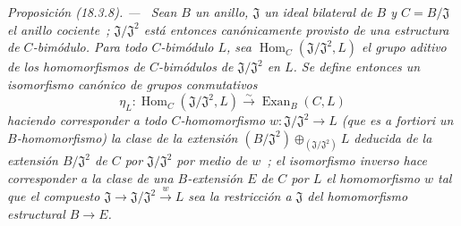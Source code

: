 \documentclass[10pt,oneside]{book}
\makeatletter
\newcommand{\setmanualcurrentlabel}[1]{\def\@currentlabel{#1}}
\newenvironment{proposition}[1][]{%
  \setmanualcurrentlabel{#1}\par\medskip\noindent\itshape Proposición (#1). ---\ }{\par}
\makeatother
\begin{document}
\begin{proposition}[18.3.8]
\label{0.18.3.8-es}
Sean $B$ un anillo, $\mathfrak J$ un ideal bilateral de $B$ y
$C=B/\mathfrak J$ el anillo cociente~; $\mathfrak J/\mathfrak J^2$ está entonces
canónicamente provisto de una estructura de $C$-bimódulo. Para todo $C$-bimódulo
$L$, sea $\operatorname{Hom}_C(\mathfrak J/\mathfrak J^2,L)$ el grupo
aditivo de los homomorfismos de $C$-bimódulos de $\mathfrak J/\mathfrak J^2$
en $L$. Se define entonces un \textup{isomorfismo} canónico de grupos conmutativos
\begin{equation}
\label{0.18.3.8.1-es}
\tag{18.3.8.1}
  \eta_L:\operatorname{Hom}_C(\mathfrak J/\mathfrak J^2,L)
  \xrightarrow{\sim}\operatorname{Exan}_B(C,L)
\end{equation}
haciendo corresponder a todo $C$-homomorfismo
$w:\mathfrak J/\mathfrak J^2\to L$ \textup{(que es \emph{a fortiori} un
$B$-homomorfismo)} la clase de la extensión
$(B/\mathfrak J^2)\oplus_{(\mathfrak J/\mathfrak J^2)}L$ deducida de
la extensión $B/\mathfrak J^2$ de $C$ por $\mathfrak J/\mathfrak J^2$ por medio
de $w$~; el isomorfismo inverso hace corresponder a la clase de una
$B$-extensión $E$ de $C$ por $L$ el homomorfismo $w$ tal que el compuesto
$\mathfrak J\to\mathfrak J/\mathfrak J^2\xrightarrow{w}L$ sea la restricción
a $\mathfrak J$ del homomorfismo estructural $B\to E$.
\end{proposition}
\end{document}
